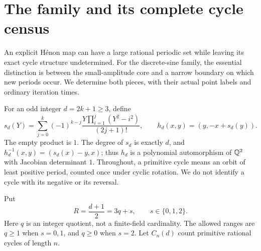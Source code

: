 \section{The family and its complete cycle census}\label{sec:main}

An explicit H\'enon map can have a large rational periodic set while
leaving its exact cycle structure undetermined. For the discrete-sine
family, the essential distinction is between the small-amplitude core
and a narrow boundary on which new periods occur. We determine both
pieces, with their actual point labels and ordinary iteration times.

For an odd integer $d=2k+1\ge3$, define
\begin{equation}\label{eq:family}
 s_d(Y)=\sum_{j=0}^{k}(-1)^{k-j}
 \frac{Y\prod_{i=1}^{j}(Y^2-i^2)}{(2j+1)!},
 \qquad h_d(x,y)=(y,-x+s_d(y)).
\end{equation}
The empty product is $1$. The degree of $s_d$ is exactly $d$, and
$h_d^{-1}(x,y)=(s_d(x)-y,x)$; thus $h_d$ is a polynomial automorphism
of $\mathbb Q^2$ with Jacobian determinant $1$. Throughout, a primitive cycle
means an orbit of least positive period, counted once under cyclic
rotation. We do not identify a cycle with its negative or its reversal.

Put
\begin{equation}\label{eq:radius}
 R=\frac{d+1}{2}=3q+s,\qquad s\in\{0,1,2\}.
\end{equation}
Here $q$ is an integer quotient, not a finite-field cardinality. The
allowed ranges are $q\ge1$ when $s=0,1$, and $q\ge0$ when $s=2$.
Let $C_n(d)$ count primitive rational cycles of length $n$.

